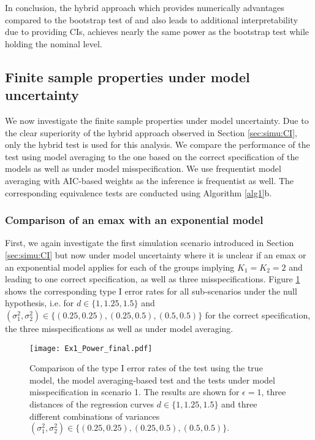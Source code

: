 {In conclusion, the hybrid approach which provides numerically advantages compared to the bootstrap test of \citet{Dette2018} and also leads to additional interpretability due to providing CIs, achieves nearly the same power as the bootstrap test while holding the nominal level. 

\subsection{Finite sample properties under model uncertainty} \label{sec:simu:MA}
We now investigate the finite sample properties under model uncertainty. Due to the clear superiority of the hybrid approach observed in Section \ref{sec:simu:CI}, only the hybrid test is used for this analysis. 
We compare the performance of the test using model averaging to the one based on the correct specification of the models as well as under model misspecification. 
We use frequentist model averaging with AIC-based weights as the inference is frequentist as well. The corresponding equivalence tests are conducted using Algorithm \ref{alg1}b.

\subsubsection{Comparison of an emax
with an exponential model} \label{sec:simu:MA:1}
First, we again investigate the first simulation scenario introduced in Section \ref{sec:simu:CI} but now under model uncertainty where it is unclear if an emax or an exponential model applies for each of the groups implying $K_1 = K_2 = 2$ and leading to one correct specification, as well as three misspecifications. 
Figure \ref{fig:Ex1_Type1} shows the corresponding type I error rates for all sub-scenarios under the null hypothesis, i.e. for $d \in \{1, 1.25, 1.5\}$ and $(\sigma_1^2, \sigma_2^2) \in \{(0.25, 0.25), (0.25, 0.5), (0.5, 0.5)\}$ for the correct specification, the three misspecifications as well as under model averaging.  
\begin{figure}  
        \centering
        \texttt{[image: Ex1\_Power\_final.pdf]}
        \caption{Comparison of the type I error rates of the test using the true model, the model averaging-based test and the tests under model misspecification in scenario 1. The results are shown for $\epsilon = 1$, three distances of the regression curves $d \in \{1, 1.25, 1.5\}$ and three different combinations of variances $(\sigma_1^2, \sigma_2^2) \in \{(0.25, 0.25), (0.25, 0.5), (0.5, 0.5)\}.$}
        \label{fig:Ex1_Type1}
\end{figure}

}
